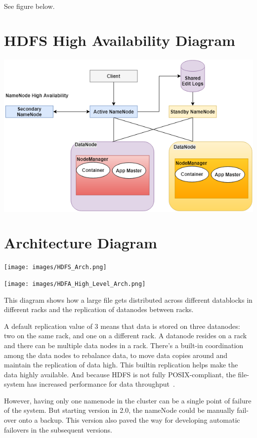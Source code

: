  See figure below.
 
\section{HDFS High Availability Diagram} 

\centering\includegraphics[width=\columnwidth]{images/HDFS_HA.png}

\section{Architecture Diagram} 

\centering\texttt{[image: images/HDFS\_Arch.png]}

\centering\texttt{[image: images/HDFA\_High\_Level\_Arch.png]}


This diagram shows how a large file gets distributed across 
different datablocks in different racks and the replication of
datanodes between racks.
 
A default replication value of 3 means that data is stored on three
datanodes: two on the same rack, and one on a different rack. A
datanode resides on a rack and there can be multiple data nodes in a
rack. There's a built-in coordination among the data nodes to
rebalance data, to move data copies around and maintain the
replication of data high. This builtin replication helps make the
data highly available. And because HDFS is not fully POSIX-compliant,
the file-system has increased performance for data throughput~\cite{hid-sp18-506-hdfs2}.

However, having only one namenode in the cluster can be a single
point of failure of the system. But starting version in 2.0, the
nameNode could be manually fail-over onto a backup. This version
also paved the way for developing automatic failovers in the
subsequent versions.

